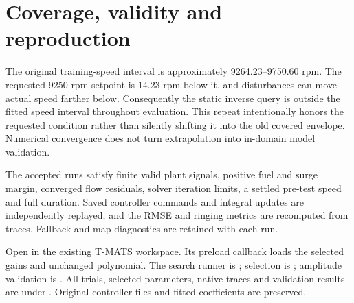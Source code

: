 \documentclass[11pt,a4paper]{article}
\begin{document}
\section{Coverage, validity and reproduction}
The original training-speed interval is approximately 9264.23--9750.60 rpm. The requested 9250 rpm setpoint is 14.23 rpm below it, and disturbances can move actual speed farther below. Consequently the static inverse query is outside the fitted speed interval throughout evaluation. This repeat intentionally honors the requested condition rather than silently shifting it into the old covered envelope. Numerical convergence does not turn extrapolation into in-domain model validation.

The accepted runs satisfy finite valid plant signals, positive fuel and surge margin, converged flow residuals, solver iteration limits, a settled pre-test speed and full duration. Saved controller commands and integral updates are independently replayed, and the RMSE and ringing metrics are recomputed from traces. Fallback and map diagnostics are retained with each run.

Open  in the existing T-MATS workspace. Its preload callback  loads the selected gains and unchanged polynomial. The search runner is ; selection is ; amplitude validation is . All trials, selected parameters, native traces and validation results are under . Original controller files and fitted coefficients are preserved.
\end{document}

